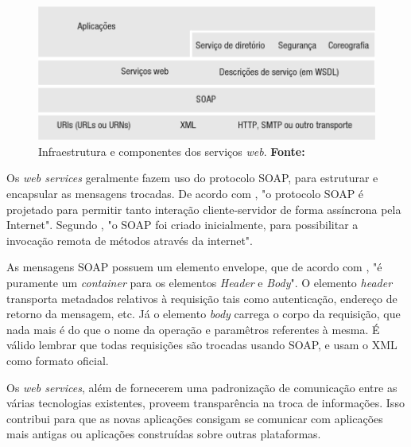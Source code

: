 \begin{figure}[h!]
	\centerline{\includegraphics[scale=0.6]{./imagens/1_q_teorico/qt2.png}}
	\caption[Infraestrutura e componentes dos serviços
		\textit{web}. ]{Infraestrutura e componentes dos serviços
		\textit{web}. \textbf{Fonte:}}
	\label{fig:qt2}
\end{figure}
	
	\par Os \textit{web services} geralmente fazem uso do protocolo SOAP, para
estruturar e encapsular as mensagens trocadas. De acordo com
, "o protocolo SOAP é projetado para permitir
tanto interação cliente-servidor de forma assíncrona pela Internet". Segundo
, "o SOAP foi criado inicialmente, para
possibilitar a invocação remota de métodos através da internet".

	\par As mensagens SOAP possuem um elemento envelope, que de acordo com
, "é puramente um \textit{container} para os
elementos \textit{Header} e \textit{Body}". O elemento \textit{header}
transporta metadados relativos à requisição tais como autenticação, endereço de
retorno da mensagem, etc. Já o elemento \textit{body} carrega o corpo da
requisição, que nada mais é do que o nome da operação e paramêtros referentes à
mesma. É válido lembrar que todas requisições são trocadas usando SOAP, e usam
o XML como formato oficial. 
	

	\par Os \textit{web services}, além de fornecerem uma padronização de
comunicação entre as várias tecnologias existentes, proveem transparência na
troca de informações. Isso contribui para que as novas aplicações consigam se
comunicar com aplicações mais antigas ou aplicações construídas sobre outras
plataformas.

